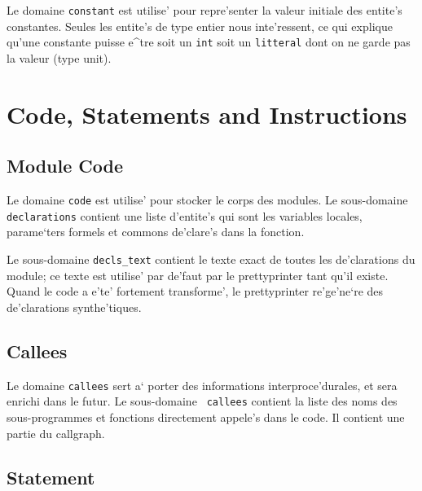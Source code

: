 {
Le domaine \verb/constant/ est utilise' pour repre'senter la valeur
initiale des entite's constantes. Seules les entite's de type entier
nous inte'ressent, ce qui explique qu'une constante puisse e^tre soit un
\verb/int/ soit un \verb/litteral/ dont on ne garde pas la valeur (type unit).
}

\section{Code, Statements and Instructions}
\label{code}

\subsection{Module Code}
\label{subsection-code}

{ 
Le domaine \verb/code/ est utilise'
pour stocker le corps des modules. Le sous-domaine \verb/declarations/
contient une liste d'entite's qui sont les variables locales,
parame`ters formels et commons de'clare's dans la fonction.

Le sous-domaine {\tt decls\_text} contient le texte exact de toutes les
de'clarations du module; ce texte est utilise' par de'faut par le
prettyprinter tant qu'il existe. Quand le code a e'te' fortement
transforme', le prettyprinter re'ge'ne`re des de'clarations
synthe'tiques.
}

\subsection{Callees}
\label{subsection-callees}


{ Le domaine {\tt callees} sert a` porter des informations
interproce'durales, et sera enrichi dans le futur.  Le sous-domaine {\tt
callees} contient la liste des noms des sous-programmes et fonctions
directement appele's dans le code. Il contient une partie du callgraph.
}

\subsection{Statement}
\label{subsection-statement}

